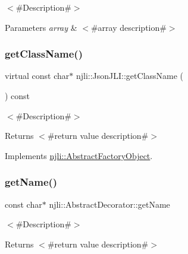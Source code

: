 $<$\#\+Description\#$>$


\begin{DoxyParams}{Parameters}
{\em array} & $<$\#array description\#$>$ \\
\hline
\end{DoxyParams}
\mbox{\label{classnjli_1_1_json_j_l_i_ad4d2f9c24a3b0758ce3e83fd9f5f2620}} 
\subsubsection{\texorpdfstring{get\+Class\+Name()}{getClassName()}}
{\footnotesize\ttfamily virtual const char$\ast$ njli\+::\+Json\+J\+L\+I\+::get\+Class\+Name (\begin{DoxyParamCaption}{ }\end{DoxyParamCaption}) const\hspace{0.3cm}{\ttfamily [virtual]}}

$<$\#\+Description\#$>$

\begin{DoxyReturn}{Returns}
$<$\#return value description\#$>$ 
\end{DoxyReturn}


Implements \mbox{\hyperlink{classnjli_1_1_abstract_factory_object_af4151e41b80d5bc3fc42822c67fc2278}{njli\+::\+Abstract\+Factory\+Object}}.

\mbox{\label{classnjli_1_1_json_j_l_i_ad41266885be835f3ee602311e20877a4}} 
\subsubsection{\texorpdfstring{get\+Name()}{getName()}}
{\footnotesize\ttfamily const char$\ast$ njli\+::\+Abstract\+Decorator\+::get\+Name}

$<$\#\+Description\#$>$

\begin{DoxyReturn}{Returns}
$<$\#return value description\#$>$ 
\end{DoxyReturn}
\mbox{\label{classnjli_1_1_json_j_l_i_ac4ca71716ed832be357f15f8262c8448}} 
